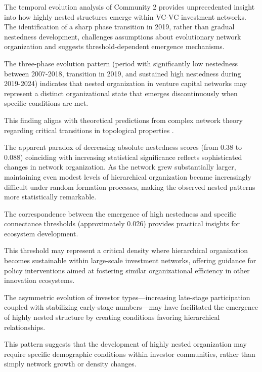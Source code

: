 
The temporal evolution analysis of Community 2 provides unprecedented insight into how highly nested structures emerge within VC-VC investment networks. The identification of a sharp phase transition in 2019, rather than gradual nestedness development, challenges assumptions about evolutionary network organization and suggests threshold-dependent emergence mechanisms.

The three-phase evolution pattern (period with significantly low nestedness between 2007-2018, transition in 2019, and sustained high nestedness during 2019-2024) indicates that nested organization in venture capital networks may represent a distinct organizational state that emerges discontinuously when specific conditions are met. 

This finding aligns with theoretical predictions from complex network theory regarding critical transitions in topological properties \cite{Mariani2019}.

The apparent paradox of decreasing absolute nestedness scores (from 0.38 to 0.088) coinciding with increasing statistical significance reflects sophisticated changes in network organization. As the network grew substantially larger, maintaining even modest levels of hierarchical organization became increasingly difficult under random formation processes, making the observed nested patterns more statistically remarkable. 

The correspondence between the emergence of high nestedness and specific connectance thresholds (approximately 0.026) provides practical insights for ecosystem development. 

This threshold may represent a critical density where hierarchical organization becomes sustainable within large-scale investment networks, offering guidance for policy interventions aimed at fostering similar organizational efficiency in other innovation ecosystems.

The asymmetric evolution of investor types—increasing late-stage participation coupled with stabilizing early-stage numbers—may have facilitated the emergence of highly nested structure by creating conditions favoring hierarchical relationships. 

This pattern suggests that the development of highly nested organization may require specific demographic conditions within investor communities, rather than simply network growth or density changes.

